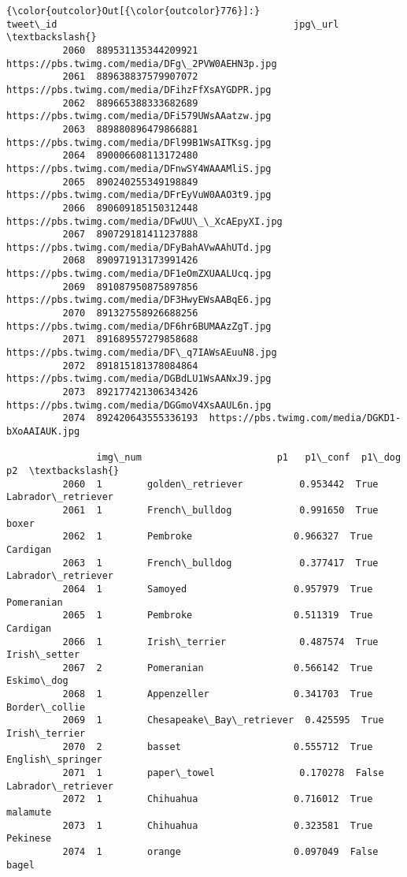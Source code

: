 \documentclass[11pt]{article}
\begin{document}
\begin{Verbatim}[commandchars=\\\{\}]
{\color{outcolor}Out[{\color{outcolor}776}]:}                 tweet\_id                                          jpg\_url  \textbackslash{}
          2060  889531135344209921  https://pbs.twimg.com/media/DFg\_2PVW0AEHN3p.jpg   
          2061  889638837579907072  https://pbs.twimg.com/media/DFihzFfXsAYGDPR.jpg   
          2062  889665388333682689  https://pbs.twimg.com/media/DFi579UWsAAatzw.jpg   
          2063  889880896479866881  https://pbs.twimg.com/media/DFl99B1WsAITKsg.jpg   
          2064  890006608113172480  https://pbs.twimg.com/media/DFnwSY4WAAAMliS.jpg   
          2065  890240255349198849  https://pbs.twimg.com/media/DFrEyVuW0AAO3t9.jpg   
          2066  890609185150312448  https://pbs.twimg.com/media/DFwUU\_\_XcAEpyXI.jpg   
          2067  890729181411237888  https://pbs.twimg.com/media/DFyBahAVwAAhUTd.jpg   
          2068  890971913173991426  https://pbs.twimg.com/media/DF1eOmZXUAALUcq.jpg   
          2069  891087950875897856  https://pbs.twimg.com/media/DF3HwyEWsAABqE6.jpg   
          2070  891327558926688256  https://pbs.twimg.com/media/DF6hr6BUMAAzZgT.jpg   
          2071  891689557279858688  https://pbs.twimg.com/media/DF\_q7IAWsAEuuN8.jpg   
          2072  891815181378084864  https://pbs.twimg.com/media/DGBdLU1WsAANxJ9.jpg   
          2073  892177421306343426  https://pbs.twimg.com/media/DGGmoV4XsAAUL6n.jpg   
          2074  892420643555336193  https://pbs.twimg.com/media/DGKD1-bXoAAIAUK.jpg   
          
                img\_num                        p1   p1\_conf  p1\_dog                  p2  \textbackslash{}
          2060  1        golden\_retriever          0.953442  True    Labrador\_retriever   
          2061  1        French\_bulldog            0.991650  True    boxer                
          2062  1        Pembroke                  0.966327  True    Cardigan             
          2063  1        French\_bulldog            0.377417  True    Labrador\_retriever   
          2064  1        Samoyed                   0.957979  True    Pomeranian           
          2065  1        Pembroke                  0.511319  True    Cardigan             
          2066  1        Irish\_terrier             0.487574  True    Irish\_setter         
          2067  2        Pomeranian                0.566142  True    Eskimo\_dog           
          2068  1        Appenzeller               0.341703  True    Border\_collie        
          2069  1        Chesapeake\_Bay\_retriever  0.425595  True    Irish\_terrier        
          2070  2        basset                    0.555712  True    English\_springer     
          2071  1        paper\_towel               0.170278  False   Labrador\_retriever   
          2072  1        Chihuahua                 0.716012  True    malamute             
          2073  1        Chihuahua                 0.323581  True    Pekinese             
          2074  1        orange                    0.097049  False   bagel                
          

\end{Verbatim}
\end{document}
